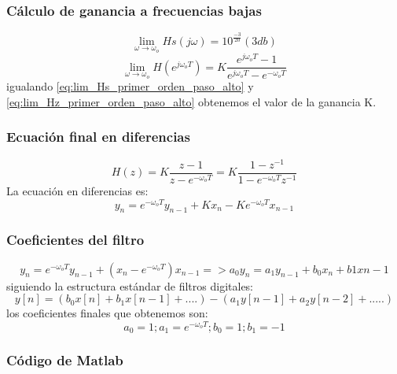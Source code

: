 \documentclass[titlepage]{article}
\begin{document}
\subsubsection{Cálculo de ganancia a frecuencias bajas}
\begin{equation}
\label{eq:lim_Hs_primer_orden_paso_alto}\lim_{\omega \to \omega_o}Hs(j\omega)=10^\frac{-3}{20}(3db)
\end{equation}
\begin{equation}
\label{eq:lim_Hz_primer_orden_paso_alto}\lim_{\omega \to \omega_o}H(e^{j\omega_oT})=K\frac{e^{j\omega_oT} -1}{e^{j\omega_oT}-e^{-\omega_oT}}
\end{equation}
\quad igualando \ref{eq:lim_Hs_primer_orden_paso_alto} y \ref{eq:lim_Hz_primer_orden_paso_alto} obtenemos el valor de la ganancia K.


\subsubsection{Ecuación final en diferencias}
\begin{equation}
		H(z)=K\frac{z-1}{z-e^{-\omega_oT}} = K\frac{1 - z^{-1}}{1-e^{-\omega_oT}z^{-1}}
\end{equation}
La ecuación en diferencias es:
\begin{equation}
\label{eqn:dif_primer_orden_paso_alto}y_n=e^{-\omega_oT}y_{n-1}+ Kx_{n} - Ke^{-\omega_oT}x_{n-1}
\end{equation}
\subsubsection{Coeficientes del filtro}
\begin{equation}
y_n=e^{-\omega_oT}y_{n-1}+(x_{n}-e^{-\omega_oT})x_{n-1} => a_0y_{n}=a_1y_{n-1}+b_0x_n + b1x{n-1}
\end{equation}
siguiendo la estructura estándar de filtros digitales:
\begin{equation}
y[n]=(b_0x[n]+b_1x[n-1]+ ....)-(a_1y[n-1] + a_2y[n-2] + .....)  
\end{equation}
los coeficientes finales que obtenemos son:
\begin{equation}
a_0=1;
a_1=e^{-\omega_oT};
b_0=1;
b_1=-1
\end{equation}

\subsubsection{Código de Matlab}

\end{document}
